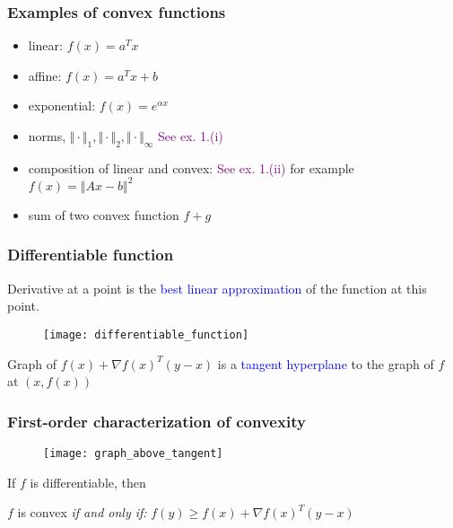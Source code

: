 \documentclass{beamer}
\begin{document}
\begin{frame}
  \frametitle{Examples of convex functions}
  \begin{itemize}
    \item linear: $f(x) = a^T x$
    \item affine: $f(x) = a^T x + b$
    \item exponential: $f(x) = e^{\alpha x}$
    \item norms, $\Vert \cdot \Vert_1, \Vert \cdot \Vert_2, \Vert \cdot \Vert_\infty$ \hfill \textcolor{purple}{See ex. 1.(i)}
    \item composition of linear and convex: \hfill \textcolor{purple}{See ex. 1.(ii)}
          \newline for example $f(x)=\Vert Ax-b  \Vert^2$
    \item sum of two convex function $f+g$
  \end{itemize}

\end{frame}


\begin{frame}
  \frametitle{Differentiable function}
  Derivative at a point is the \textcolor{blue}{best linear approximation} of the function at this point.
  \begin{figure}[ht]
    \centering
    \texttt{[image: differentiable\_function]}
  \end{figure}
  \begin{center}
    Graph of $f(x)+ {\nabla f(x)}^T (y-x)$ is a \textcolor{blue}{tangent hyperplane} to the graph of $f$ at $(x,f(x))$
  \end{center}
\end{frame}


\begin{frame}
  \frametitle{First-order characterization of convexity}

  \begin{figure}[ht]
    \centering
    \texttt{[image: graph\_above\_tangent]}
  \end{figure}
  If $f$ is differentiable, then
  \begin{center}
    $f$ is convex \emph{if and only if:} $f(y) \ge f(x) + {\nabla f(x)}^T (y-x)$
  \end{center}
\end{frame}
\end{document}
